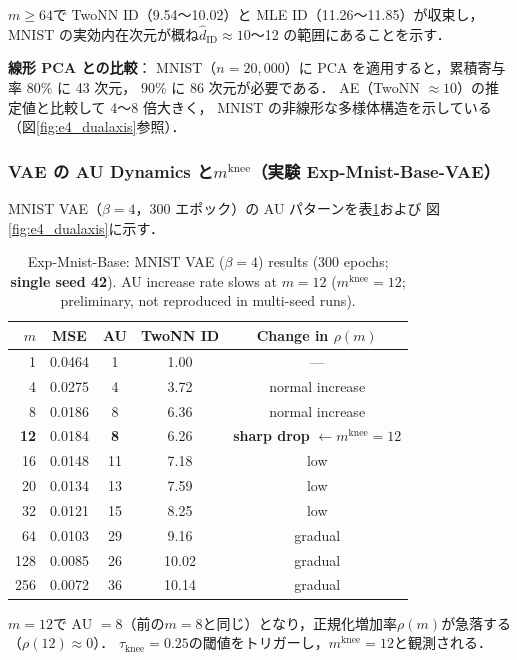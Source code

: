 \documentclass[11pt,a4paper]{jsarticle}
\newcommand{\mknee}{m^{\mathrm{knee}}}
\begin{document}
$m \geq 64$で TwoNN ID（9.54〜10.02）と MLE ID（11.26〜11.85）が収束し，
MNIST の実効内在次元が概ね$\hat{d}_\mathrm{ID} \approx 10$〜12 の範囲にあることを示す．

\textbf{線形 PCA との比較}：
MNIST（$n = 20{,}000$）に PCA を適用すると，累積寄与率 80\% に 43 次元，
90\% に 86 次元が必要である．
AE（TwoNN $\approx 10$）の推定値と比較して 4〜8 倍大きく，
MNIST の非線形な多様体構造を示している（図\ref{fig:e4_dualaxis}参照）．

\subsubsection{VAE の AU Dynamics と$\mknee$（実験 Exp-Mnist-Base-VAE）}

MNIST VAE（$\beta = 4$，300 エポック）の AU パターンを表\ref{tab:e4_vae}および
図\ref{fig:e4_dualaxis}に示す．

\begin{table}[H]
\centering
\caption{Exp-Mnist-Base: MNIST VAE ($\beta=4$) results (300 epochs; \textbf{single seed 42}). AU increase rate slows at $m=12$ ($\mknee=12$; preliminary, not reproduced in multi-seed runs).}
\label{tab:e4_vae}
\small
\begin{tabular}{rcccc}
\toprule
$m$ & MSE & AU & TwoNN ID & Change in $\rho(m)$ \\
\midrule
1   & 0.0464 & 1  & 1.00 & --- \\
4   & 0.0275 & 4  & 3.72 & normal increase \\
8   & 0.0186 & 8  & 6.36 & normal increase \\
\textbf{12} & 0.0184 & \textbf{8}  & 6.26 & \textbf{sharp drop} $\leftarrow \mknee = 12$ \\
16  & 0.0148 & 11 & 7.18 & low \\
20  & 0.0134 & 13 & 7.59 & low \\
32  & 0.0121 & 15 & 8.25 & low \\
64  & 0.0103 & 29 & 9.16 & gradual \\
128 & 0.0085 & 26 & 10.02 & gradual \\
256 & 0.0072 & 36 & 10.14 & gradual \\
\bottomrule
\end{tabular}
\end{table}

$m = 12$で AU $= 8$（前の$m = 8$と同じ）となり，正規化増加率$\rho(m)$が急落する（$\rho(12) \approx 0$）．
$\tau_{\mathrm{knee}} = 0.25$の閾値をトリガーし，$\mknee = 12$と観測される．
\end{document}
